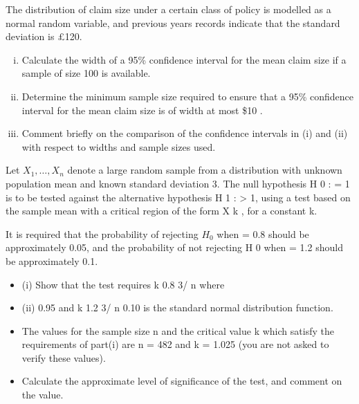 \documentclass[a4paper,12pt]{article}
\begin{document}

The distribution of claim size under a certain class of policy is modelled as a normal random variable, and previous years records indicate that the standard deviation is £120.

\begin{enumerate}[(i)]
\item Calculate the width of a 95\% confidence interval for the mean claim size if a sample of size 100 is available.

\item Determine the minimum sample size required to ensure that a 95\% confidence interval for the mean claim size is of width at most \$10 .

\item Comment briefly on the comparison of the confidence intervals in (i) and (ii) with respect to widths and sample sizes used.
\end{enumerate}

\newpage 
Let $X_1 , \ldots , X_n$ denote a large random sample from a distribution with unknown population mean and known standard deviation 3. The null hypothesis H 0 : = 1 is to be tested against the alternative hypothesis H 1 : > 1, using a test based on the
sample mean with a critical region of the form X
k , for a constant k.

It is required that the probability of rejecting $H_0$ when = 0.8 should be approximately 0.05, and the probability of not rejecting H 0 when = 1.2 should be approximately 0.1.

\begin{itemize}
\item (i)
Show that the test requires
k 0.8
3/ n
where
\item (ii)
0.95 and
k 1.2
3/ n
0.10
is the standard normal distribution function.

\item The values for the sample size n and the critical value k which satisfy the requirements of part(i) are n = 482 and k = 1.025 (you are not asked to verify these values).

\item Calculate the approximate level of significance of the test, and comment on the value.
\end{itemize}
\end{document}
